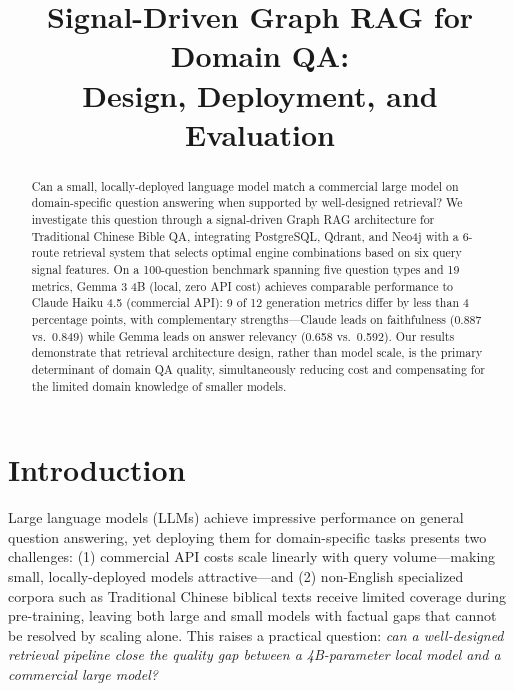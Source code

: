 \documentclass[10pt,conference,letterpaper]{IEEEtran}
\begin{document}
\title{Signal-Driven Graph RAG for Domain QA:\\ Design, Deployment, and Evaluation}

\author{
}

\maketitle

\begin{abstract}
Can a small, locally-deployed language model match a commercial large model on domain-specific question answering when supported by well-designed retrieval? We investigate this question through a signal-driven Graph RAG architecture for Traditional Chinese Bible QA, integrating PostgreSQL, Qdrant, and Neo4j with a 6-route retrieval system that selects optimal engine combinations based on six query signal features. On a 100-question benchmark spanning five question types and 19 metrics, Gemma 3 4B (local, zero API cost) achieves comparable performance to Claude Haiku 4.5 (commercial API): 9 of 12 generation metrics differ by less than 4 percentage points, with complementary strengths---Claude leads on faithfulness (0.887 vs.\ 0.849) while Gemma leads on answer relevancy (0.658 vs.\ 0.592). Our results demonstrate that retrieval architecture design, rather than model scale, is the primary determinant of domain QA quality, simultaneously reducing cost and compensating for the limited domain knowledge of smaller models.
\end{abstract}

\section{Introduction}

Large language models (LLMs) achieve impressive performance on general question answering, yet deploying them for domain-specific tasks presents two challenges: (1) commercial API costs scale linearly with query volume---making small, locally-deployed models attractive---and (2) non-English specialized corpora such as Traditional Chinese biblical texts receive limited coverage during pre-training, leaving both large and small models with factual gaps that cannot be resolved by scaling alone. This raises a practical question: \textit{can a well-designed retrieval pipeline close the quality gap between a 4B-parameter local model and a commercial large model?}
\end{document}
